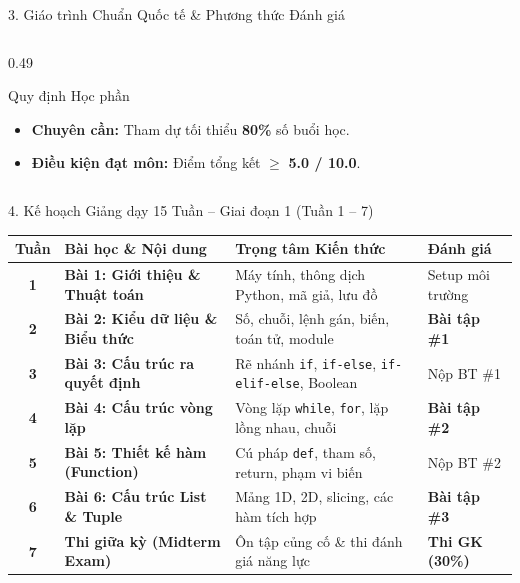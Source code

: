 \documentclass[aspectratio=169, 10pt]{beamer}
\begin{document}
\begin{frame}{3. Giáo trình Chuẩn Quốc tế \& Phương thức Đánh giá}
\begin{columns}[T]
\begin{column}{0.49\textwidth}
      \begin{cbox}[accentorange]{Quy định Học phần}
        \footnotesize
        \begin{itemize}\setlength{\itemsep}{2pt}
          \item \textbf{Chuyên cần:} Tham dự tối thiểu \textbf{80\%} số buổi học.
          \item \textbf{Điều kiện đạt môn:} Điểm tổng kết $\ge$ \textbf{5.0 / 10.0}.
        \end{itemize}
      \end{cbox}
    \end{column}
  \end{columns}
\end{frame}

\begin{frame}{4. Kế hoạch Giảng dạy 15 Tuần -- Giai đoạn 1 (Tuần 1 -- 7)}
  \scriptsize
  \begin{tabularx}{\textwidth}{c l X l}
    \toprule
    \textbf{Tuần} & \textbf{Bài học \& Nội dung} & \textbf{Trọng tâm Kiến thức} & \textbf{Đánh giá} \\
    \midrule
    \textbf{1} & \textbf{Bài 1: Giới thiệu \& Thuật toán} & Máy tính, thông dịch Python, mã giả, lưu đồ & Setup môi trường \\
    \textbf{2} & \textbf{Bài 2: Kiểu dữ liệu \& Biểu thức} & Số, chuỗi, lệnh gán, biến, toán tử, module & \textbf{Bài tập \#1} \\
    \textbf{3} & \textbf{Bài 3: Cấu trúc ra quyết định} & Rẽ nhánh \texttt{if}, \texttt{if-else}, \texttt{if-elif-else}, Boolean & Nộp BT \#1 \\
    \textbf{4} & \textbf{Bài 4: Cấu trúc vòng lặp} & Vòng lặp \texttt{while}, \texttt{for}, lặp lồng nhau, chuỗi & \textbf{Bài tập \#2} \\
    \textbf{5} & \textbf{Bài 5: Thiết kế hàm (Function)} & Cú pháp \texttt{def}, tham số, return, phạm vi biến & Nộp BT \#2 \\
    \textbf{6} & \textbf{Bài 6: Cấu trúc List \& Tuple} & Mảng 1D, 2D, slicing, các hàm tích hợp & \textbf{Bài tập \#3} \\
    \textbf{7} & \textbf{Thi giữa kỳ (Midterm Exam)} & Ôn tập củng cố \& thi đánh giá năng lực & \textbf{Thi GK (30\%)} \\
    \bottomrule
  \end{tabularx}
\end{frame}
\end{document}
